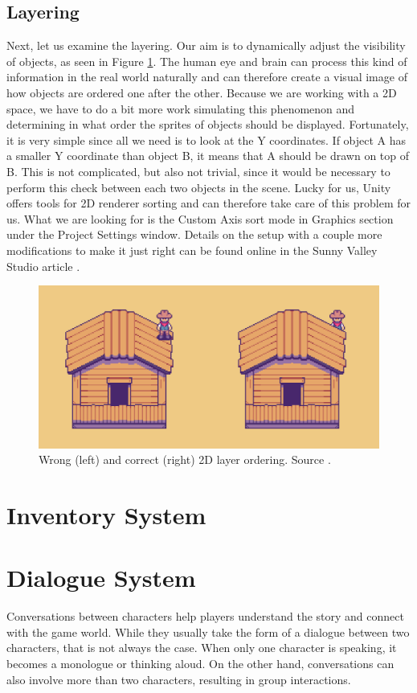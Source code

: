 \subsection{Layering}
Next, let us examine the layering. Our aim is to dynamically adjust the visibility of objects, as seen in Figure \ref{fig:Layers}. The human eye and brain can process this kind of information in the real world naturally and can therefore create a visual image of how objects are ordered one after the other. Because we are working with a 2D space, we have to do a bit more work simulating this phenomenon and determining in what order the sprites of objects should be displayed. Fortunately, it is very simple since all we need is to look at the Y coordinates. If object A has a smaller Y coordinate than object B, it means that A should be drawn on top of B. This is not complicated, but also not trivial, since it would be necessary to perform this check between each two objects in the scene. Lucky for us, Unity offers tools for 2D renderer sorting \cite{Unity-sorting} and can therefore take care of this problem for us. What we are looking for is the Custom Axis sort mode \cite{Unity-customAxis} in Graphics section under the Project Settings window. Details on the setup with a couple more modifications to make it just right can be found online in the Sunny Valley Studio article \cite{Piotr} . 

\begin{figure}[H]
\centering
\includegraphics[width=.8\linewidth]{img/layers.png}
\caption{Wrong (left) and correct (right) 2D layer ordering. Source \cite{Piotr}.}
\label{fig:Layers}
\end{figure}

\section{Inventory System}


\section{Dialogue System}
Conversations between characters help players understand the story and connect with the game world. While they usually take the form of a dialogue between two characters, that is not always the case. When only one character is speaking, it becomes a monologue or thinking aloud. On the other hand, conversations can also involve more than two characters, resulting in group interactions. 

